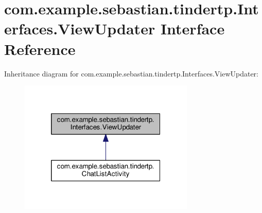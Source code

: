 \hypertarget{interfacecom_1_1example_1_1sebastian_1_1tindertp_1_1Interfaces_1_1ViewUpdater}{}\section{com.\+example.\+sebastian.\+tindertp.\+Interfaces.\+View\+Updater Interface Reference}
\label{interfacecom_1_1example_1_1sebastian_1_1tindertp_1_1Interfaces_1_1ViewUpdater}


Inheritance diagram for com.\+example.\+sebastian.\+tindertp.\+Interfaces.\+View\+Updater\+:\nopagebreak
\begin{figure}[H]
\begin{center}
\leavevmode
\includegraphics[width=236pt]{interfacecom_1_1example_1_1sebastian_1_1tindertp_1_1Interfaces_1_1ViewUpdater__inherit__graph}
\end{center}
\end{figure}
